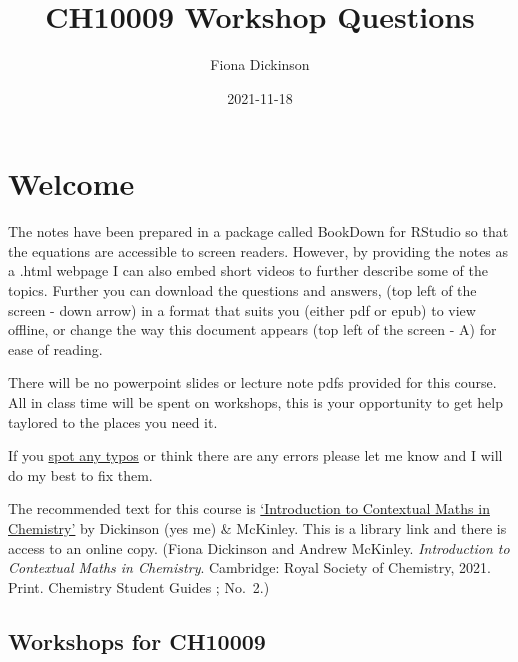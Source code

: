 \documentclass[
]{book}
\title{CH10009 Workshop Questions}
\author{Fiona Dickinson}
\date{2021-11-18}
\begin{document}
\maketitle

{
\setcounter{tocdepth}{1}
\tableofcontents
}
\hypertarget{welcome}{%
\chapter*{Welcome}\label{welcome}}

The notes have been prepared in a package called BookDown for RStudio so that the equations are accessible to screen readers. However, by providing the notes as a .html webpage I can also embed short videos to further describe some of the topics. Further you can download the questions and answers, (top left of the screen - down arrow) in a format that suits you (either pdf or epub) to view offline, or change the way this document appears (top left of the screen - A) for ease of reading.

There will be no powerpoint slides or lecture note pdfs provided for this course. All in class time will be spent on workshops, this is your opportunity to get help taylored to the places you need it.

If you \href{https://docs.google.com/forms/d/1hxCt8XcQ8taLXfymZfl2LUOjHACQ4INnRK6GeArTxsc/edit}{spot any typos} or think there are any errors please let me know and I will do my best to fix them.

The recommended text for this course is \href{https://bath-ac-primo.hosted.exlibrisgroup.com/primo-explore/fulldisplay?docid=44BAT_ALMA_DS51100784580002761\&context=L\&vid=44BAT_VU1\&lang=en_US\&search_scope=CSCOP_44BAT_DEEP\&adaptor=Local\%20Search\%20Engine\&tab=local\&query=any,contains,contextual\%20maths\%20in\%20chemistry\&sortby=rank\&pcAvailability=false}{`Introduction to Contextual Maths in Chemistry'} by Dickinson (yes me) \& McKinley. This is a library link and there is access to an online copy. (Fiona Dickinson and Andrew McKinley. \emph{Introduction to Contextual Maths in Chemistry}. Cambridge: Royal Society of Chemistry, 2021. Print. Chemistry Student Guides ; No.~2.)

\hypertarget{workshops-for-ch10009}{%
\section*{Workshops for CH10009}\label{workshops-for-ch10009}}
\end{document}
